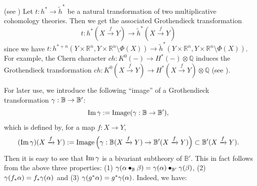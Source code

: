 \documentclass[a4paper]{amsart}
\begin{document}
\begin{rem}(see \cite[\S 3.2 Grothendieck transformations of topological theories]{FM}) \label{contra}
Let $t: h^* \to \widetilde h^*$ be a natural transformation of two multiplicative cohomology theories. Then we get the associated Grothendieck transformation
\begin{equation}\label{bivari-h}
t:h^*( X \xrightarrow f Y) \to \widetilde h^*( X \xrightarrow f Y) 
\end{equation}
since we have $t: h^{*+n}(Y \times \mathbb R^n, Y \times \mathbb R^n \setminus \Phi(X)) \to \widetilde h^*(Y \times \mathbb R^n, Y \times \mathbb R^n \setminus \Phi(X))$. For example, the Chern character
$ch: K^0(-) \to H^*(-) \otimes \mathbb Q$ induces the Grothendieck transformation
$ch: K^0(X \xrightarrow f Y) \to H^*(X \xrightarrow f Y) \otimes \mathbb Q$ (see \cite[\S 3.2.2 Examples]{FM}).
\end{rem}
For later use, we introduce the following ``image'' of a Grothendieck transformation $\gamma: \mathbb B \to \mathbb B'$:
$$\operatorname{Im} \gamma := \operatorname{Image}(\gamma: \mathbb B \to \mathbb B'),$$
which is defined by, for a map $f:X \to Y$,
$$(\operatorname{Im}\gamma) (X \xrightarrow f Y):=  \operatorname{Image}\left (\gamma: \mathbb B(X \xrightarrow f Y)  \to \mathbb B'(X \xrightarrow f Y) \right ) \subset \mathbb B'(X \xrightarrow f Y).$$
Then it is easy to see that $\operatorname{Im}\gamma$ is a bivariant subtheory of $\mathbb B'$. This in fact follows from the above three properties: (1) $\gamma (\alpha \bullet_{\mathbb B} \beta) = \gamma (\alpha) \bullet _{\mathbb B'} \gamma (\beta)$, (2) $\gamma(f_{*}\alpha) = f_*\gamma (\alpha)$ and (3) $\gamma (g^* \alpha) = g^* \gamma (\alpha)$. Indeed, we have: 
\end{document}
